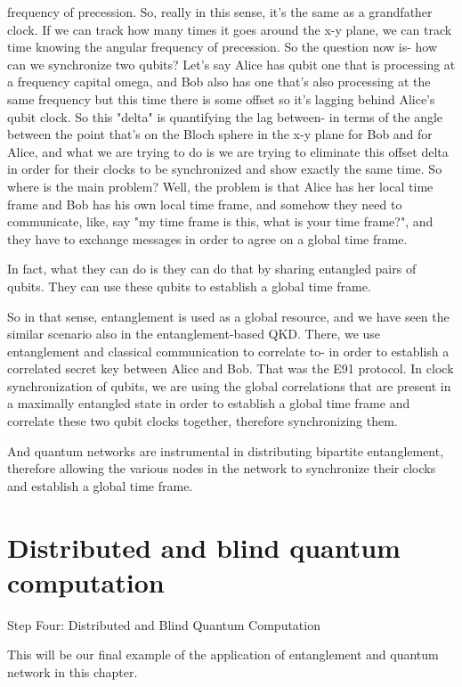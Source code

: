 frequency of precession. So, really in this sense, it's the same as a grandfather clock. If we can track how many times it goes around the x-y plane, we can track time knowing the angular frequency of precession. So the question now is- how can we synchronize two qubits? Let's say Alice has qubit one that is processing at a frequency capital omega, and Bob also has one that's also processing at the same frequency but this time there is some offset so it's lagging behind Alice's qubit clock. So this "delta" is quantifying the lag between- in terms of the angle between the point that's on the Bloch sphere in the x-y plane for Bob and for Alice, and what we are trying to do is we are trying to eliminate this offset delta in order for their clocks to be synchronized and show exactly the same time. So where is the main problem? Well, the problem is that Alice has her local time frame and Bob has his own local time frame, and somehow they need to communicate, like, say "my time frame is this, what is your time frame?", and they have to exchange messages in order to agree on a global time frame.

In fact, what they can do is they can do that by sharing entangled pairs of qubits. They can use these qubits to establish a global time frame.

So in that sense, entanglement is used as a global resource, and we have seen the similar scenario also in the entanglement-based QKD. There, we use entanglement and classical communication to correlate to- in order to establish a correlated secret key between Alice and Bob. That was the E91 protocol. In clock synchronization of qubits, we are using the global correlations that are present in a maximally entangled state in order to establish a global time frame and correlate these two qubit clocks together, therefore synchronizing them.

And quantum networks are instrumental in distributing bipartite entanglement, therefore allowing the various nodes in the network to synchronize their clocks and establish a global time frame.



\section{Distributed and blind quantum computation}
\label{sec:14-4_distributed_bqc}

Step Four: Distributed and Blind Quantum Computation

This will be our final example of the application of entanglement and quantum network in this chapter.

